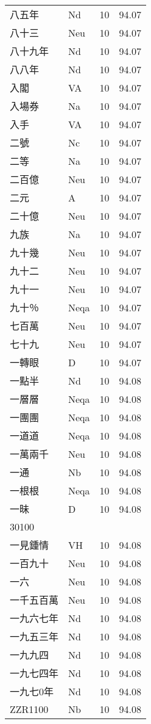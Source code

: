 \documentclass[twocolumn]{book}
\begin{document}
\begin{supertabular}{llrr}
八五年 & Nd & 10 &  94.07\\
八十三 & Neu & 10 &  94.07\\
八十九年 & Nd & 10 &  94.07\\
八八年 & Nd & 10 &  94.07\\
入閣 & VA & 10 &  94.07\\
入場券 & Na & 10 &  94.07\\
入手 & VA & 10 &  94.07\\
二號 & Nc & 10 &  94.07\\
二等 & Na & 10 &  94.07\\
二百億 & Neu & 10 &  94.07\\
二元 & A & 10 &  94.07\\
二十億 & Neu & 10 &  94.07\\
九族 & Na & 10 &  94.07\\
九十幾 & Neu & 10 &  94.07\\
九十二 & Neu & 10 &  94.07\\
九十一 & Neu & 10 &  94.07\\
九十％ & Neqa & 10 &  94.07\\
七百萬 & Neu & 10 &  94.07\\
七十九 & Neu & 10 &  94.07\\
一轉眼 & D & 10 &  94.07\\
一點半 & Nd & 10 &  94.08\\
一層層 & Neqa & 10 &  94.08\\
一團團 & Neqa & 10 &  94.08\\
一道道 & Neqa & 10 &  94.08\\
一萬兩千 & Neu & 10 &  94.08\\
一通 & Nb & 10 &  94.08\\
一根根 & Neqa & 10 &  94.08\\
一昧 & D & 10 &  94.08\\
30100\\
一見鍾情 & VH & 10 &  94.08\\
一百九十 & Neu & 10 &  94.08\\
一六 & Neu & 10 &  94.08\\
一千五百萬 & Neu & 10 &  94.08\\
一九六七年 & Nd & 10 &  94.08\\
一九五三年 & Nd & 10 &  94.08\\
一九九四 & Nd & 10 &  94.08\\
一九七四年 & Nd & 10 &  94.08\\
一九七0年 & Nd & 10 &  94.08\\
ZZR1100 & Nb & 10 &  94.08\\

\end{supertabular}
\end{document}

